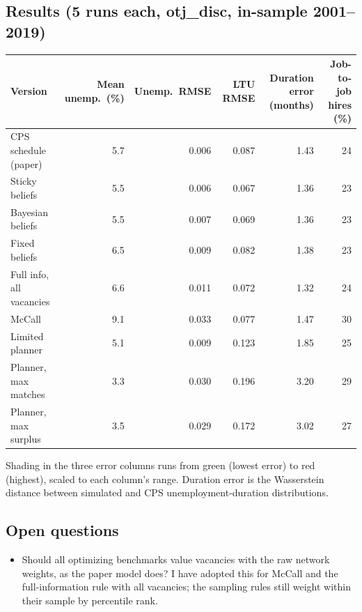 \documentclass[10pt]{article}
\begin{document}
\subsection*{Results (5 runs each, otj\_disc, in-sample 2001--2019)}
\footnotesize
\begin{tabularx}{\textwidth}{@{}Lrrrrr@{}}
\toprule
Version & Mean unemp.\ (\%) & Unemp.\ RMSE & LTU RMSE & Duration error (months) & Job-to-job hires (\%) \\
\midrule
CPS schedule (paper) & 5.7 & 0.006 & 0.087 & 1.43 & 24 \\
Sticky beliefs & 5.5 & 0.006 & 0.067 & 1.36 & 23 \\
Bayesian beliefs & 5.5 & 0.007 & 0.069 & 1.36 & 23 \\
Fixed beliefs & 6.5 & 0.009 & 0.082 & 1.38 & 23 \\
Full info, all vacancies & 6.6 & 0.011 & 0.072 & 1.32 & 24 \\
McCall & 9.1 & 0.033 & 0.077 & 1.47 & 30 \\
Limited planner & 5.1 & 0.009 & 0.123 & 1.85 & 25 \\
Planner, max matches & 3.3 & 0.030 & 0.196 & 3.20 & 29 \\
Planner, max surplus & 3.5 & 0.029 & 0.172 & 3.02 & 27 \\
\bottomrule
\end{tabularx}

\smallskip
Shading in the three error columns runs from green (lowest error) to red (highest), scaled to each column's range.
Duration error is the Wasserstein distance between simulated and CPS unemployment-duration distributions.

\normalsize
\subsection*{Open questions}
\begin{itemize}[leftmargin=*]
  \item Should all optimizing benchmarks value vacancies with the raw network weights, as the paper model does?
  I have adopted this for McCall and the full-information rule with all vacancies; the sampling rules still
  weight within their sample by percentile rank.
\end{itemize}
\end{document}
